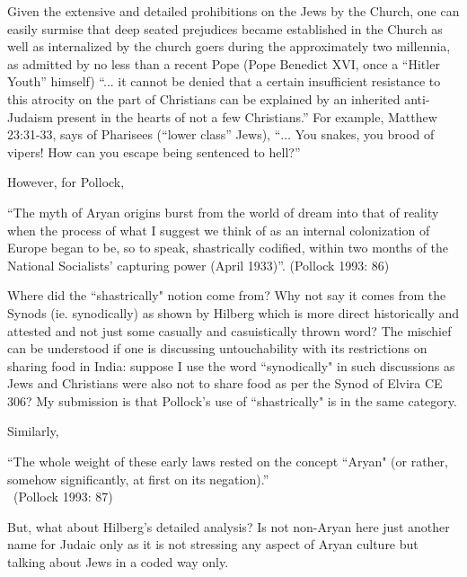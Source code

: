 Given the extensive and detailed prohibitions on the Jews by the Church, one can easily surmise that deep seated prejudices became established in the Church as well as internalized by the church goers during the approximately two millennia, as admitted by no less than a recent Pope (Pope Benedict XVI, once a ``Hitler Youth'' himself) “... it cannot be denied that a certain insufficient resistance to this atrocity on the part of Christians can be explained by an inherited anti-Judaism present in the hearts of not a few Christians.” For example, Matthew 23:31-33, says of Pharisees (“lower class” Jews), “$\ldots$ You snakes, you brood of vipers! How can you escape being sentenced to hell?”

However, for Pollock, 
\begin{myquote}
“The myth of Aryan origins burst from the world of dream into that of reality when the process of what I suggest we think of as an internal colonization of Europe began to be, so to speak, shastrically codified, within two months of the National Socialists' capturing power (April 1933)”. 	\hfill (Pollock 1993: 86)
\end{myquote}

Where did the ``shastrically" notion come from? Why not say it comes from the Synods (ie. synodically) as shown by Hilberg which is more direct historically and attested and not just some casually and casuistically thrown word? The mischief can be understood if one is discussing untouchability with its restrictions on sharing food in India: suppose I use the word ``synodically" in such discussions as Jews and Christians were also not to share food as per the Synod of Elvira CE 306? My submission is that Pollock's use of ``shastrically" is in the same category.

Similarly, 
\begin{myquote}
``The whole weight of these early laws rested on the concept ``Aryan" (or rather, somehow significantly, at first on its negation).”\\[-15pt]

~\hfill(Pollock 1993: 87)
\end{myquote}

But, what about Hilberg's detailed analysis? Is not non-Aryan here just another name for Judaic only as it is not stressing any aspect of Aryan culture but talking about Jews in a coded way only.

